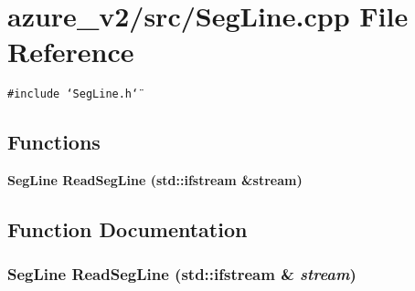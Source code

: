 \section{azure\_\-v2/src/Seg\-Line.cpp File Reference}
\label{SegLine_8cpp}
{\tt \#include \char`\"{}Seg\-Line.h\char`\"{}}\par
\subsection*{Functions}
\begin{CompactItemize}
\item 
\bf{Seg\-Line} \bf{Read\-Seg\-Line} (std::ifstream \&stream)
\end{CompactItemize}


\subsection{Function Documentation}
\subsubsection{\setlength{\rightskip}{0pt plus 5cm}\bf{Seg\-Line} Read\-Seg\-Line (std::ifstream \& {\em stream})}\label{SegLine_8cpp_d3da8919b1dffe274e1110877104a535}



